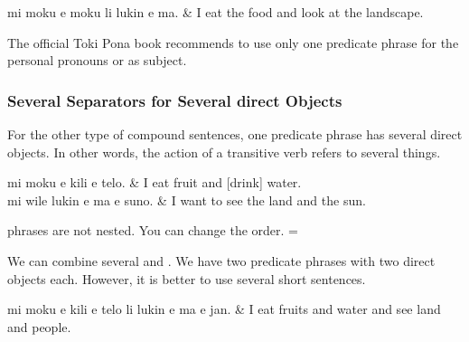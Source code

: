 \begin{translationtable}
    mi moku e moku li lukin e ma. & I eat the food and look at the landscape. \\
\end{translationtable}
%
The official Toki Pona book recommends to use only one predicate phrase for the personal pronouns  or  as subject.

\subsubsection*{Several  Separators for Several direct Objects}
\label{sssec:multiple_e}
For the other type of compound sentences, one predicate phrase has several direct objects.
In other words, the action of a transitive verb refers to several things.

\begin{translationtable}
    mi moku e kili e telo.     & I eat fruit and [drink] water.      \\
    mi wile lukin e ma e suno. & I want to see the land and the sun. \\
\end{translationtable}
%
 phrases are not nested. You can change the order.
 = 

We can combine several  and .
We have two predicate phrases with two direct objects each.
However, it is better to use several short sentences.

\begin{translationtable}
    mi moku e kili e telo li lukin e ma e jan. & I eat fruits and water and see land and people. \\
\end{translationtable}

